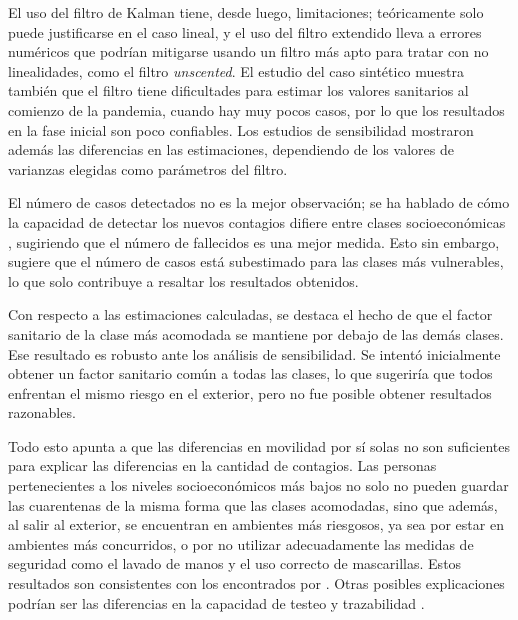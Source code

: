 
El uso del filtro de Kalman tiene, desde luego, limitaciones; teóricamente solo puede justificarse en el caso lineal, y el uso del filtro extendido lleva a errores numéricos que podrían mitigarse usando un filtro más apto para tratar con no linealidades, como el filtro \textit{unscented}. El estudio del caso sintético muestra también que el filtro tiene dificultades para estimar los valores sanitarios al comienzo de la pandemia, cuando hay muy pocos casos, por lo que los resultados en la fase inicial son poco confiables. Los estudios de sensibilidad mostraron además las diferencias en las estimaciones, dependiendo de los valores de varianzas elegidas como parámetros del filtro.

El número de casos detectados no es la mejor observación; se ha hablado de cómo la capacidad de detectar los nuevos contagios difiere entre clases socioeconómicas \cite{Mena2021}, sugiriendo que el número de fallecidos es una mejor medida. Esto sin embargo, sugiere que el número de casos está subestimado para las clases más vulnerables, lo que solo contribuye a resaltar los resultados obtenidos.

Con respecto a las estimaciones calculadas, se destaca el hecho de que el factor sanitario de la clase más acomodada se mantiene por debajo de las demás clases. Ese resultado es robusto ante los análisis de sensibilidad. Se intentó inicialmente obtener un factor sanitario común a todas las clases, lo que sugeriría que todos enfrentan el mismo riesgo en el exterior, pero no fue posible obtener resultados razonables.

Todo esto apunta a que las diferencias en movilidad por sí solas no son suficientes para explicar las diferencias en la cantidad de contagios. Las personas pertenecientes a los niveles socioeconómicos más bajos no solo no pueden guardar las cuarentenas de la misma forma que las clases acomodadas, sino que además, al salir al exterior, se encuentran en ambientes más riesgosos, ya sea por estar en ambientes más concurridos, o por no utilizar adecuadamente las medidas de seguridad como el lavado de manos y el uso correcto de mascarillas. Estos resultados son consistentes con los encontrados por \cite{Chang2021}. Otras posibles explicaciones podrían ser las diferencias en la capacidad de testeo y trazabilidad \cite{Bennett2021}\cite{Mena2021}.

